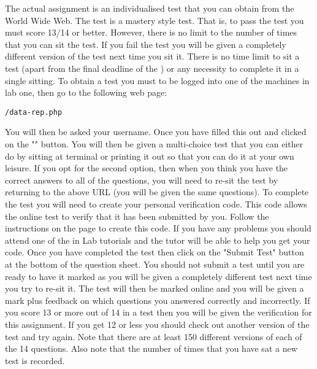 \documentclass[a4paper,10pt]{article}
\begin{document}
The actual assignment is an individualised test that 
you can obtain from the World Wide Web. The
test is a mastery style test. That is, to pass the 
test you must score 13/14 or better. However, there is
no limit to the number of times that you can sit the 
test. If you fail the test you will be given a
completely different version of the test next 
time you sit it. There is no time limit to sit a test (apart
from the final deadline of the \DATADUE) or 
any necessity to complete it in a single sitting. To obtain a
test you must to be logged into one of the 
machines in lab one, then go to the following web page:

\begin{center}
   \texttt{\WEBPAGEDIR/data-rep.php }
\end{center}

You will then be asked your username. Once you have filled this out
and clicked on the "" button. You will then be given a
multi-choice test that you can either do by sitting at terminal or
printing it out so that you can do it at your own leisure. If you opt
for the second option, then when you think you have the correct
answers to all of the questions, you will need to re-sit the test by
returning to the above URL (you will be given the same questions). To
complete the test you will need to create your personal verification
code. This code allows the online test to verify that it has been
submitted by you. Follow the instructions on the page to create this
code. If you have any problems you should attend one of the in Lab
tutorials and the tutor will be able to help you get your code. Once
you have completed the test then click on the "Submit Test" button at
the bottom of the question sheet. You should not submit a test until
you are ready to have it marked as you will be given a completely
different test next time you try to re-sit it.  The test will then be
marked online and you will be given a mark plus feedback on which
questions you answered correctly and incorrectly. If you score 13 or
more out of 14 in a test then you will be given the verification for
this assignment. If you get 12 or less you should check out another
version of the test and try again. Note that there are at least 150
different versions of each of the 14 questions.  Also note that the
number of times that you have sat a new test is recorded.

\thispagestyle{rcsfooters}
\pagestyle{rcsfooters}
\end{document}
